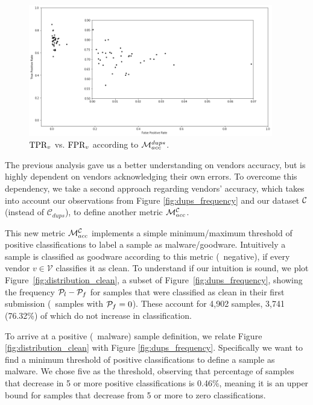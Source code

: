 \begin{figure}[!htb]
	\centering
	\includegraphics[width=0.95\textwidth]{Figures/dr_fpr_own.png}
	\caption{$\textrm{TPR}_v$ vs. $\textrm{FPR}_v$ according to $\mathcal{M}_{acc}^{{dups}}$.}
	\label{fig:dr_fpr_own}
\end{figure}

The previous analysis gave us a better understanding on vendors accuracy, but is highly dependent on vendors acknowledging their own errors.
To overcome this dependency, we take a second approach regarding vendors' accuracy, which takes into account our observations from Figure \ref{fig:dups_frequency} and our dataset $\mathcal{C}$ (instead of $\mathcal{C}_{dups}$), to define another metric $\mathcal{M}_{acc}^{\mathcal{C}}$.

This new metric $\mathcal{M}_{acc}^{\mathcal{C}}$ implements a simple minimum/maximum threshold of positive classifications to label a sample as malware/goodware.
Intuitively a sample is classified as goodware according to this metric (\ie\  negative), if every vendor $v\in\mathcal{V}$ classifies it as clean.
To understand if our intuition is sound, we plot Figure~\ref{fig:distribution_clean}, a subset of Figure~\ref{fig:dups_frequency}, showing the frequency $\mathcal{P}_{l}-\mathcal{P}_{f}$ for samples that were classified as clean in their first submission (\ie\ samples with $\mathcal{P}_{f}=0$).
These account for 4,902 samples, 3,741 (76.32\%) of which do not increase in classification.

To arrive at a positive (\ie\ malware) sample definition, we relate Figure \ref{fig:distribution_clean} with Figure \ref{fig:dups_frequency}.
Specifically we want to find a minimum threshold of positive classifications to define a sample as malware.
We chose five as the threshold, observing that percentage of samples that decrease in 5 or more positive classifications is 0.46\%, meaning it is an upper bound for samples that decrease from 5 or more to zero classifications.

